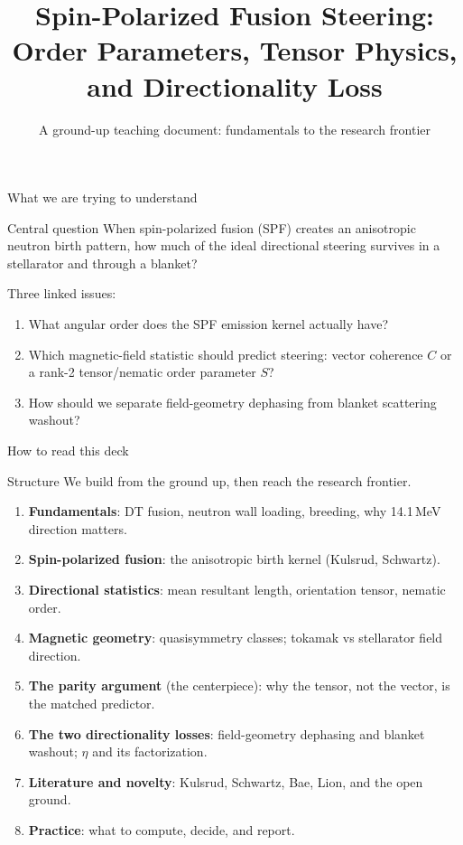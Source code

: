 \documentclass[aspectratio=169]{beamer}
\title{Spin-Polarized Fusion Steering: Order Parameters, Tensor Physics, and Directionality Loss}
\subtitle{A ground-up teaching document: fundamentals to the research frontier}
\author{}
\date{}
\begin{document}
\begin{frame}
  \titlepage
\end{frame}

\begin{frame}[t]{What we are trying to understand}
\begin{block}{Central question}
When spin-polarized fusion (SPF) creates an anisotropic neutron birth pattern, how much of the ideal directional steering survives in a stellarator and through a blanket?
\end{block}
\vspace{0.5em}
Three linked issues:
\begin{enumerate}
  \item What angular order does the SPF emission kernel actually have?
  \item Which magnetic-field statistic should predict steering: vector coherence $C$ or a rank-2 tensor/nematic order parameter $S$?
  \item How should we separate field-geometry dephasing from blanket scattering washout?
\end{enumerate}
\end{frame}

\begin{frame}[t]{How to read this deck}
\begin{block}{Structure}
We build from the ground up, then reach the research frontier.
\end{block}
\begin{enumerate}
  \item \textbf{Fundamentals}: DT fusion, neutron wall loading, breeding, why 14.1\,MeV direction matters.
  \item \textbf{Spin-polarized fusion}: the anisotropic birth kernel (Kulsrud, Schwartz).
  \item \textbf{Directional statistics}: mean resultant length, orientation tensor, nematic order.
  \item \textbf{Magnetic geometry}: quasisymmetry classes; tokamak vs stellarator field direction.
  \item \textbf{The parity argument} (the centerpiece): why the tensor, not the vector, is the matched predictor.
  \item \textbf{The two directionality losses}: field-geometry dephasing and blanket washout; $\eta$ and its factorization.
  \item \textbf{Literature and novelty}: Kulsrud, Schwartz, Bae, Lion, and the open ground.
  \item \textbf{Practice}: what to compute, decide, and report.
\end{enumerate}
\end{frame}
\end{document}
